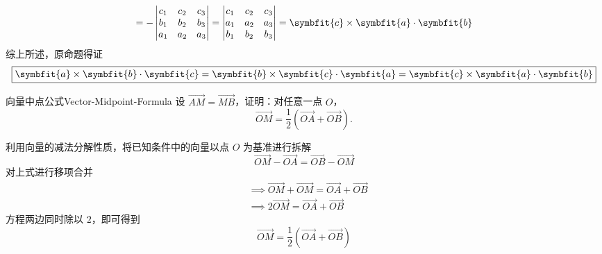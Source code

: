 \begin{myproof}
\begin{equation}
        = - \begin{vmatrix} c_1 & c_2 & c_3 \\ b_1 & b_2 & b_3 \\ a_1 & a_2 & a_3 \end{vmatrix}
        = \begin{vmatrix} c_1 & c_2 & c_3 \\ a_1 & a_2 & a_3 \\ b_1 & b_2 & b_3 \end{vmatrix} = \symbfit{c} \times \symbfit{a} \cdot \symbfit{b}
    \end{equation}
    综上所述，原命题得证
    \begin{equation}
        \boxed{\symbfit{a} \times \symbfit{b} \cdot \symbfit{c} = \symbfit{b} \times \symbfit{c} \cdot \symbfit{a} = \symbfit{c} \times \symbfit{a} \cdot \symbfit{b}}
    \end{equation}
\end{myproof}


\begin{problem}{向量中点公式}{Vector-Midpoint-Formula}
    设 $\overrightarrow{AM} = \overrightarrow{MB}$，证明：对任意一点 $O$，
    \begin{equation}
        \overrightarrow{OM} = \frac{1}{2} (\overrightarrow{OA} + \overrightarrow{OB}).
    \end{equation}
\end{problem}

\begin{myproof}
    利用向量的减法分解性质，将已知条件中的向量以点 $O$ 为基准进行拆解
    \begin{equation}
        \overrightarrow{OM} - \overrightarrow{OA} = \overrightarrow{OB} - \overrightarrow{OM}
    \end{equation}
    对上式进行移项合并
    \begin{equation}
        \begin{aligned}
             & \implies \overrightarrow{OM} + \overrightarrow{OM} = \overrightarrow{OA} + \overrightarrow{OB} \\
             & \implies 2 \overrightarrow{OM} = \overrightarrow{OA} + \overrightarrow{OB}
        \end{aligned}
    \end{equation}
    方程两边同时除以 $2$，即可得到
    \begin{equation}
        \boxed{\overrightarrow{OM} = \frac{1}{2} (\overrightarrow{OA} + \overrightarrow{OB})}
    \end{equation}
\end{myproof}


